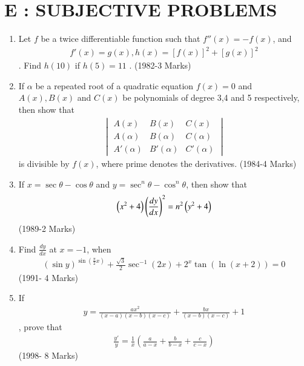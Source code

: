 \documentclass[journal,,12pt,twocolumn]{IEEEtran}
\theoremstyle{remark}
\begin{document}
\section*{E : SUBJECTIVE PROBLEMS}
\begin{enumerate}
\item Let $f$ be a twice differentiable function such that 
$f''(x)=-f(x)$, and \begin{align*}f'(x)=g(x) , h(x)=[f(x)]^2+[g(x)]^2\end{align*}. Find $h(10)$ if $h(5)=11$ .
\hfill{(1982-3 Marks)}
\item If $\alpha$ be a repeated root of a quadratic equation $f(x)=0$ and $A(x),B(x)$ and $C(x)$ be polynomials of degree 3,4 and 5 respectively, then show that \begin{align*}\begin{vmatrix}
A(x) & B(x) & C(x) \\
A(\alpha) & B(\alpha) & C(\alpha) \\
A'(\alpha) & B'(\alpha) & C'(\alpha) 
\end{vmatrix} \end{align*}
is divisible by $f(x)$, where prime denotes the derivatives.
\hfill{(1984-4 Marks)}
\item If $x=\sec{\theta}-\cos{\theta}$ and $y=\sec^n{\theta}-\cos^n{\theta}$, then show that \begin{align*} \left(x^2 + 4\right) \left(\frac{dy}{dx}\right)^2=n^2 \left(y^2+4\right) \end{align*}
\hfill{(1989-2 Marks)}
\item Find $\frac{dy}{dx}$ at $x=-1$, when \begin{align*}(\sin{y})^{\sin(\frac{\pi}{2}x)} + \frac{\sqrt{3}}{2}\sec^{-1}{(2x)} + 2^x\tan{(\ln{(x+2)})} = 0 \end{align*}
\hfill{(1991- 4 Marks)}
\item If \begin{align*}y = \frac{ax^2}{(x-a)(x-b)(x-c)}+\frac{bx}{(x-b)(x-c)}+1\end{align*}, prove that \begin{align*}\frac{y'}{y}=\frac{1}{x}(\frac{a}{a-x}+\frac{b}{b-x}+\frac{c}{c-x})\end{align*}
\hfill{(1998- 8 Marks)}
\end{enumerate}
\end{document}
